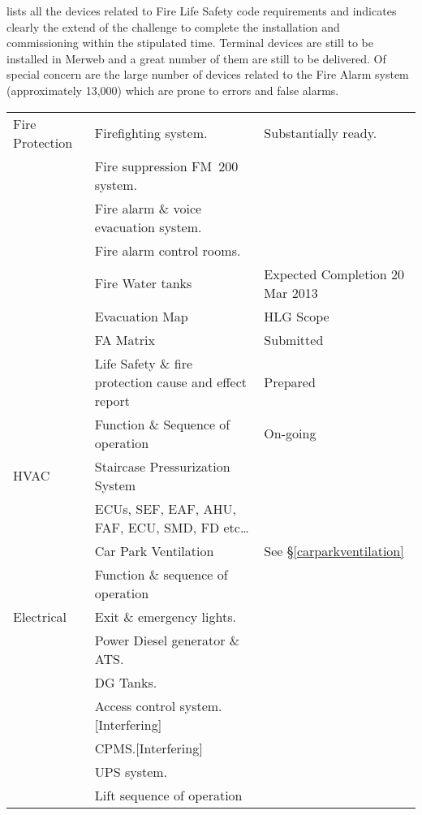  lists all the devices related to Fire Life Safety code requirements and indicates clearly the extend of the challenge to complete the installation and commissioning within the stipulated time. Terminal devices are still to be installed in Merweb and a great number of them are still to be delivered. Of special concern are the large number of devices related to the Fire Alarm system (approximately 13,000) which are prone to errors and false alarms.




\medskip

\label{cdd}
{\small\RaggedRight
\begin{longtable}{p{2.3cm}p{4.2cm}p{4.2cm}}

\toprule
Fire Protection    &Firefighting system.  & Substantially ready.\\
    &Fire suppression FM~200 system. & \\
	&Fire alarm \& voice evacuation system. &\\
	&Fire alarm control rooms. &\\
	&Fire Water tanks & Expected Completion 20 Mar 2013\\
	&Evacuation Map & HLG Scope\\
	&FA Matrix & Submitted\\
	&Life Safety \& fire protection cause and 
         effect report & Prepared\\
	&Function \& Sequence of operation & On-going\\
\midrule

HVAC	&Staircase Pressurization System &\\
	&ECUs, SEF, EAF, AHU, FAF, ECU, SMD, FD etc… &\\
	&Car Park Ventilation & See \S\ref{carparkventilation}\\
	&Function \& sequence of operation &\\
\midrule


Electrical	&Exit \& emergency lights. &\\
	&Power Diesel generator \& ATS. &\\
	&DG Tanks. &\\
	&Access control system. [Interfering] &\\
	&CPMS.[Interfering] &\\
	&UPS system. &\\
	&Lift sequence of operation &\\
\midrule


\end{longtable}}

